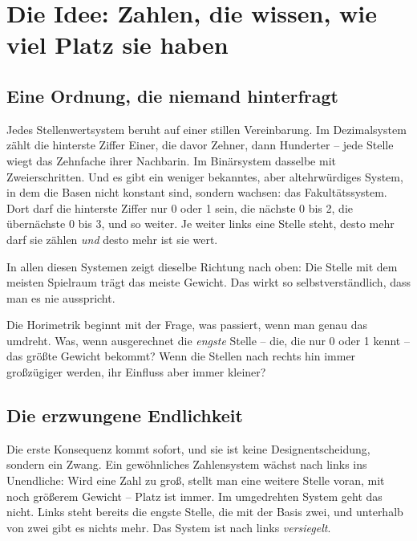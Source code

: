 \chapter{Die Idee: Zahlen, die wissen, wie viel Platz sie haben}
\label{ch:idee}


\section{Eine Ordnung, die niemand hinterfragt}

Jedes Stellenwertsystem beruht auf einer stillen Vereinbarung. Im
Dezimalsystem zählt die hinterste Ziffer Einer, die davor Zehner, dann
Hunderter -- jede Stelle wiegt das Zehnfache ihrer Nachbarin. Im
Binärsystem dasselbe mit Zweierschritten. Und es gibt ein weniger
bekanntes, aber altehrwürdiges System, in dem die Basen nicht konstant
sind, sondern wachsen: das Fakultätssystem. Dort darf die hinterste
Ziffer nur 0 oder 1 sein, die nächste 0 bis 2, die übernächste 0 bis 3,
und so weiter. Je weiter links eine Stelle steht, desto mehr darf sie
zählen \emph{und} desto mehr ist sie wert.

In allen diesen Systemen zeigt dieselbe Richtung nach oben: Die Stelle
mit dem meisten Spielraum trägt das meiste Gewicht. Das wirkt so
selbstverständlich, dass man es nie ausspricht.

Die Horimetrik beginnt mit der Frage, was passiert, wenn man genau das
umdreht. Was, wenn ausgerechnet die \emph{engste} Stelle -- die, die
nur 0 oder 1 kennt -- das größte Gewicht bekommt? Wenn die Stellen
nach rechts hin immer großzügiger werden, ihr Einfluss aber immer
kleiner?

\section{Die erzwungene Endlichkeit}

Die erste Konsequenz kommt sofort, und sie ist keine Designentscheidung,
sondern ein Zwang. Ein gewöhnliches Zahlensystem wächst nach links ins
Unendliche: Wird eine Zahl zu groß, stellt man eine weitere Stelle
voran, mit noch größerem Gewicht -- Platz ist immer. Im umgedrehten
System geht das nicht. Links steht bereits die engste Stelle, die mit
der Basis zwei, und unterhalb von zwei gibt es nichts mehr. Das System
ist nach links \emph{versiegelt}.

